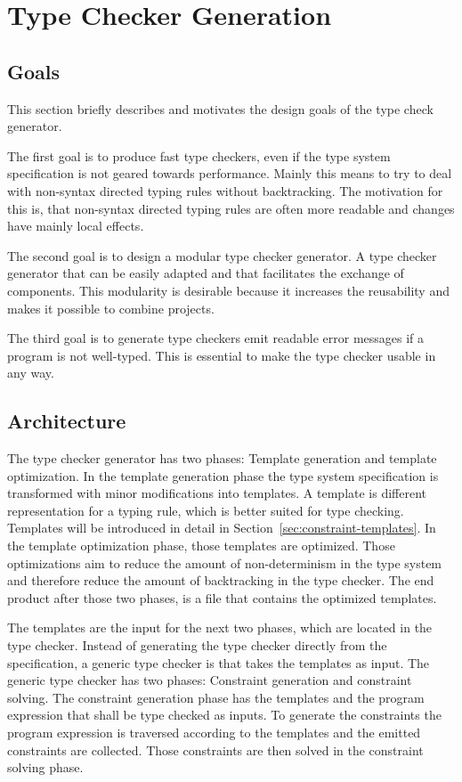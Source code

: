 \chapter{Type Checker Generation}
\section{Goals}
This section briefly describes and motivates the design goals of the
type check generator.

The first goal is to produce fast type checkers, even if the type
system specification is not geared towards performance. Mainly this
means to try to deal with non-syntax directed typing rules without
backtracking. The motivation for this is, that non-syntax directed
typing rules are often more readable and changes have mainly local
effects.

The second goal is to design a modular type checker generator. A type
checker generator that can be easily adapted and that facilitates the
exchange of components. This modularity is desirable because it
increases the reusability and makes it possible to combine projects.

The third goal is to generate type checkers emit readable error
messages if a program is not well-typed. This is essential to make the
type checker usable in any way.
\section{Architecture}
The type checker generator has two phases: Template generation and
template optimization. In the template generation phase the type
system specification is transformed with minor modifications into
templates. A template is different representation for a typing rule,
which is better suited for type checking. Templates will be introduced
in detail in Section~\ref{sec:constraint-templates}. In the template
optimization phase, those templates are optimized. Those optimizations
aim to reduce the amount of non-determinism in the type system and
therefore reduce the amount of backtracking in the type checker. The
end product after those two phases, is a file that contains the
optimized templates.

The templates are the input for the next two phases, which are located
in the type checker. Instead of generating the type checker directly
from the specification, a generic type checker is that takes the
templates as input. The generic type checker has two phases:
Constraint generation and constraint solving. The constraint
generation phase has the templates and the program expression that shall be type
checked as inputs. To generate the constraints the program expression
is traversed according to the templates and the emitted constraints
are collected. Those constraints are then solved in the constraint
solving phase.

